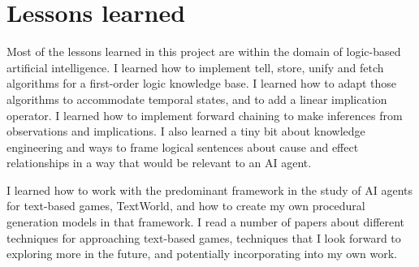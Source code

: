 \section{Lessons learned}

Most of the lessons learned in this project are within the domain of
logic-based artificial intelligence. I learned how to implement
tell, store, unify and fetch algorithms for a first-order logic
knowledge base. I learned how to adapt those algorithms to accommodate
temporal states, and to add a linear implication operator. I learned how
to implement forward chaining to make inferences from observations and
implications. I also learned a tiny bit about knowledge engineering and
ways to frame logical sentences about cause and effect relationships in
a way that would be relevant to an AI agent.

I learned how to work with the predominant framework in the study of AI
agents for text-based games, TextWorld\cite{cote_textworld_2019}, and
how to create my own procedural generation models in that framework.
I read a number of papers about different techniques for approaching
text-based games, techniques that I look forward to exploring more in
the future, and potentially incorporating into my own work.
